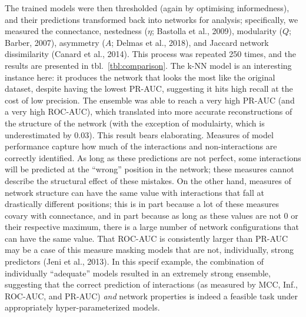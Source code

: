 \documentclass[10pt,oneside]{article}
\begin{document}
The trained models were then thresholded (again by optimising
informedness), and their predictions transformed back into networks for
analysis; specifically, we measured the connectance, nestedness
(\(\eta\); Bastolla et al., 2009), modularity (\(Q\); Barber, 2007),
asymmetry (\(A\); Delmas et al., 2018), and Jaccard network
dissimilarity (Canard et al., 2014). This process was repeated 250
times, and the results are presented in tbl.~\ref{tbl:comparison}. The
k-NN model is an interesting instance here: it produces the network that
looks the most like the original dataset, despite having the lowest
PR-AUC, suggesting it hits high recall at the cost of low precision. The
ensemble was able to reach a very high PR-AUC (and a very high ROC-AUC),
which translated into more accurate reconstructions of the structure of
the network (with the exception of modulairty, which is underestimated
by \(0.03\)). This result bears elaborating. Measures of model
performance capture how much of the interactions and non-interactions
are correctly identified. As long as these predictions are not perfect,
some interactions will be predicted at the ``wrong'' position in the
network; these measures cannot describe the structural effect of these
mistakes. On the other hand, measures of network structure can have the
same value with interactions that fall at drastically different
positions; this is in part because a lot of these measures covary with
connectance, and in part because as long as these values are not 0 or
their respective maximum, there is a large number of network
configurations that can have the same value. That ROC-AUC is
consistently larger than PR-AUC may be a case of this measure masking
models that are not, individually, strong predictors (Jeni et al.,
2013). In this specif example, the combination of individually
``adequate'' models resulted in an extremely strong ensemble, suggesting
that the correct prediction of interactions (as measured by MCC, Inf.,
ROC-AUC, and PR-AUC) \emph{and} network properties is indeed a feasible
task under appropriately hyper-parameterized models.
\end{document}
